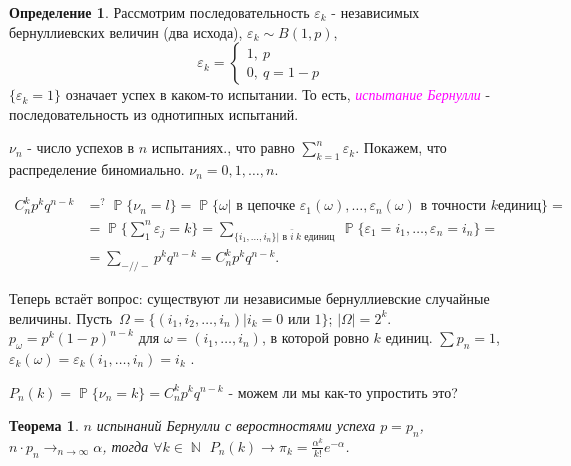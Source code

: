 \documentclass[a4paper,100pt]{article}
\theoremstyle{indented}
\newtheorem{theorem}{Теорема}
\theoremstyle{definition}
\newtheorem{defn}{Определение}
\theoremstyle{remark}
\DeclareMathOperator{\NN}{\mathbb{N}}
\DeclareMathOperator{\PP}{\mathbb{P}}
\begin{document}
\begin{defn}
  Рассмотрим последовательность $\varepsilon_k$ - независимых бернуллиевских величин (два исхода), $\varepsilon_k\sim B(1, p)$, 
  \begin{equation*}
      \varepsilon_k=
      \begin{cases}
          1, \: p \\ 
          0, \: q=1-p
      \end{cases}
  \end{equation*}
  $\{\varepsilon_k=1\}$ означает успех в каком-то испытании. То есть, \hypertarget{n12}{\textcolor{magenta}{\textit{испытание Бернулли}}} - последовательность из однотипных испытаний.
\end{defn}

$\nu_n$ - число успехов в $n$ испытаниях., что равно $\sum_{k=1}^n\varepsilon_k$. Покажем, что распределение биномиально. $\nu_n=0, 1, \ldots, n$.

\begin{equation*} 
  \begin{aligned}
      C_n^kp^kq^{n-k} & =^?\PP\{\nu_n=l\}=\PP\{\omega\vert \text{ в цепочке }\varepsilon_1(\omega), \ldots, \varepsilon_n(\omega)\text{ в точности } k \text{единиц}\}= \\ 
      & = \PP\{\sum_1^n\varepsilon_j=k\}=\sum_{\{i_1, \ldots, i_n\}| \text{ в } \bar{i} \: k \text{ единиц }}\PP\{\varepsilon_1= i_1, \ldots, \varepsilon_n=i_n\}= \\ 
      & = \sum_{-//-}p^kq^{n-k}=C_n^k p^kq^{n-k}.
  \end{aligned}
\end{equation*} 

Теперь встаёт вопрос: существуют ли независимые бернуллиевские случайные величины. Пусть $\Omega=\{(i_1, i_2, \ldots, i_n)|i_k=0 \text{ или }1\}$; $|\Omega|=2^k$. $p_{\omega}= p^k(1-p)^{n-k}$ для $\omega=(i_1, \ldots, i_n)$, в которой ровно $k$ единиц. $\sum p_n=1$, $\varepsilon_k(\omega)=\varepsilon_k(i_1, \ldots, i_n)=i_k$ .\

$P_n(k)=\PP\{\nu_n=k\}=C_n^kp^kq^{n-k}$ - можем ли мы как-то упростить это? \\

\begin{theorem}
  $n$ испынаний Бернулли с веростностями успеха $p=p_n$, $n\cdot p_n\rightarrow_{n\rightarrow \infty} \alpha$, тогда $\forall k\in \NN$ $P_n(k)\rightarrow \pi_k=\frac{\alpha^k}{k!}e^{-\alpha}$. 
\end{theorem}
\end{document}
